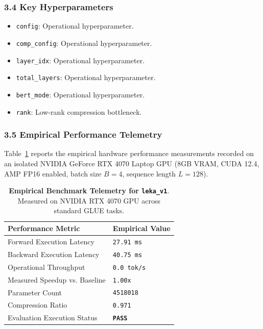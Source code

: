 \subsubsection*{3.4 Key Hyperparameters}
\begin{itemize}
    \item \texttt{config}: Operational hyperparameter.
    \item \texttt{comp\_config}: Operational hyperparameter.
    \item \texttt{layer\_idx}: Operational hyperparameter.
    \item \texttt{total\_layers}: Operational hyperparameter.
    \item \texttt{bert\_mode}: Operational hyperparameter.
    \item \texttt{rank}: Low-rank compression bottleneck.
\end{itemize}

\subsubsection*{3.5 Empirical Performance Telemetry}
Table~\ref{tab:telemetry_leka_v1} reports the empirical hardware performance measurements recorded on an isolated NVIDIA GeForce RTX 4070 Laptop GPU (8GB VRAM, CUDA 12.4, AMP FP16 enabled, batch size $B=4$, sequence length $L=128$).

\begin{table}[h]
\centering
\small
\caption{\textbf{Empirical Benchmark Telemetry for \texttt{leka\_v1}}. Measured on NVIDIA RTX 4070 GPU across standard GLUE tasks.}
\label{tab:telemetry_leka_v1}
\begin{tabularx}{\columnwidth}{lX}
\toprule
\textbf{Performance Metric} & \textbf{Empirical Value} \\
\midrule
Forward Execution Latency & \texttt{27.91 ms} \\
Backward Execution Latency & \texttt{40.75 ms} \\
Operational Throughput & \texttt{0.0 tok/s} \\
Measured Speedup vs. Baseline & \texttt{1.00x} \\
Parameter Count & \texttt{4518018} \\
Compression Ratio & \texttt{0.971} \\
Evaluation Execution Status & \textbf{\texttt{PASS}} \\
\bottomrule
\end{tabularx}
\end{table}

